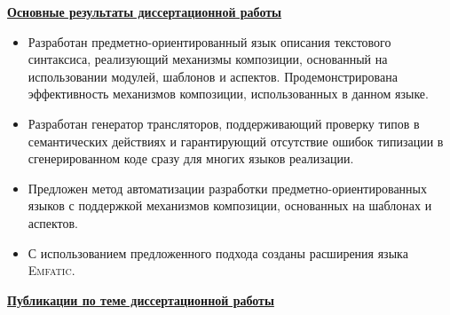 \documentclass[12pt,a4paper]{article}
\newcommand{\tool}[1]{\textsc{#1}}
\theoremstyle{definition}
\theoremstyle{plain}
\newcommand{\afsubsection}[1]{\par \underline{\textbf{#1}}}
\begin{document}
\afsubsection{Основные результаты диссертационной работы}
\begin{itemize}
\item Разработан предметно-ориентированный язык описания текстового синтаксиса, реализующий механизмы композиции, основанный на использовании модулей, шаблонов и аспектов. Продемонстрирована эффективность механизмов композиции, использованных в данном языке.
\item Разработан генератор трансляторов, поддерживающий проверку типов в семантических действиях и гарантирующий отсутствие ошибок типизации в сгенерированном коде сразу для многих языков реализации.
\item Предложен метод автоматизации разработки предметно-ориентированных языков с поддержкой механизмов композиции, основанных на шаблонах и аспектов.
\item С использованием предложенного подхода созданы расширения языка \tool{Emfatic}.
\end{itemize}

\par
\begin{center}
\afsubsection{Публикации по теме диссертационной работы}
\vspace{-40pt}
\end{center}
\makeatletter
\renewcommand\@biblabel[1]{#1.}
\makeatother
\renewcommand{\refname}{}

\end{document}
